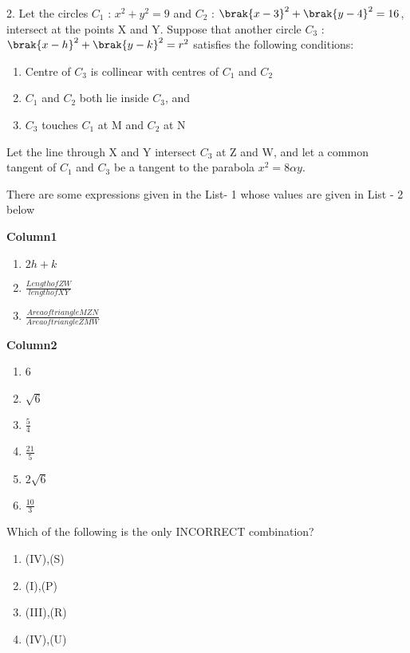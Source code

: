 \documentclass[journal,12pt,twocolumn]{IEEEtran}
\theoremstyle{remark}
\begin{document}
\begin{enumerate}
2. Let the circles $C_{1}$ : $x^2+y^2=9$ and $C_{2}$ : $\brak{x-3}^2+\brak{y-4}^2=16$, intersect at the points X and Y. Suppose that another circle $C_{3}$ : $\brak{x-h}^2+\brak{y-k}^2=r^2$ satisfies the following conditions: 

\begin{enumerate}[label=(\roman*)]                       
\item Centre of $C_{3}$ is collinear with centres of $C_{1}$ and $C_{2}$                         
\item $C_{1}$ and $C_{2}$ both lie inside $C_{3}$, and                                            
\item $C_{3}$ touches $C_{1}$ at M and $C_{2}$ at N
\end{enumerate}                              
Let the line through X and Y intersect $C_{3}$ at Z and W, and let a common tangent of $C_{1}$ and $C_{3}$ be a tangent to the parabola $x^2=8\alpha y$.

There are some expressions given in the List- 1 whose values are given in List - 2 below
\begin{multicols}


	\textbf{Column{1}}

\begin{enumerate}[label=(\Alph*)]

 \item $2h+k$
 \item $\frac{Length of ZW}{length of XY}$
 \item $\frac{Area of triangle MZN}{Area of triangle ZMW}$                     \end{enumerate}                             
 \columnbreak
 \textbf{Column{2}}

 \begin{enumerate}[label=(\alph*) , start=16]                                              
 \item 6                                      
 \item $\sqrt{6}$                              
 \item $\frac{5}{4}$                          
 \item $\frac{21}{5}$                          
 \item $2\sqrt{6}$               
 \item $\frac{10}{3}$                         
 \end{enumerate}     
 \end{multicols}
 Which of the following is the only INCORRECT combination?


\begin{enumerate}[label=(\alph*)] 
 \item (IV),(S)
 \item (I),(P)
 \item (III),(R)    
 \item (IV),(U)
  
  \end{enumerate}
  \end{enumerate}
 
 
\end{document}
